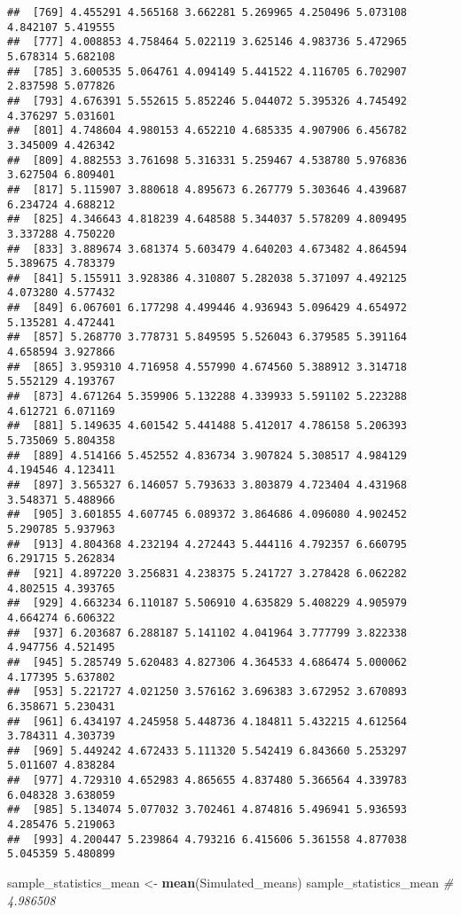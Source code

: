 \documentclass[
]{article}
\newenvironment{Shaded}{\begin{snugshade}}{\end{snugshade}}
\newcommand{\CommentTok}[1]{\textcolor[rgb]{0.56,0.35,0.01}{\textit{#1}}}
\newcommand{\KeywordTok}[1]{\textcolor[rgb]{0.13,0.29,0.53}{\textbf{#1}}}
\newcommand{\NormalTok}[1]{#1}
\newcommand{\StringTok}[1]{\textcolor[rgb]{0.31,0.60,0.02}{#1}}
\begin{document}
\begin{verbatim}
##  [769] 4.455291 4.565168 3.662281 5.269965 4.250496 5.073108 4.842107 5.419555
##  [777] 4.008853 4.758464 5.022119 3.625146 4.983736 5.472965 5.678314 5.682108
##  [785] 3.600535 5.064761 4.094149 5.441522 4.116705 6.702907 2.837598 5.077826
##  [793] 4.676391 5.552615 5.852246 5.044072 5.395326 4.745492 4.376297 5.031601
##  [801] 4.748604 4.980153 4.652210 4.685335 4.907906 6.456782 3.345009 4.426342
##  [809] 4.882553 3.761698 5.316331 5.259467 4.538780 5.976836 3.627504 6.809401
##  [817] 5.115907 3.880618 4.895673 6.267779 5.303646 4.439687 6.234724 4.688212
##  [825] 4.346643 4.818239 4.648588 5.344037 5.578209 4.809495 3.337288 4.750220
##  [833] 3.889674 3.681374 5.603479 4.640203 4.673482 4.864594 5.389675 4.783379
##  [841] 5.155911 3.928386 4.310807 5.282038 5.371097 4.492125 4.073280 4.577432
##  [849] 6.067601 6.177298 4.499446 4.936943 5.096429 4.654972 5.135281 4.472441
##  [857] 5.268770 3.778731 5.849595 5.526043 6.379585 5.391164 4.658594 3.927866
##  [865] 3.959310 4.716958 4.557990 4.674560 5.388912 3.314718 5.552129 4.193767
##  [873] 4.671264 5.359906 5.132288 4.339933 5.591102 5.223288 4.612721 6.071169
##  [881] 5.149635 4.601542 5.441488 5.412017 4.786158 5.206393 5.735069 5.804358
##  [889] 4.514166 5.452552 4.836734 3.907824 5.308517 4.984129 4.194546 4.123411
##  [897] 3.565327 6.146057 5.793633 3.803879 4.723404 4.431968 3.548371 5.488966
##  [905] 3.601855 4.607745 6.089372 3.864686 4.096080 4.902452 5.290785 5.937963
##  [913] 4.804368 4.232194 4.272443 5.444116 4.792357 6.660795 6.291715 5.262834
##  [921] 4.897220 3.256831 4.238375 5.241727 3.278428 6.062282 4.802515 4.393765
##  [929] 4.663234 6.110187 5.506910 4.635829 5.408229 4.905979 4.664274 6.606322
##  [937] 6.203687 6.288187 5.141102 4.041964 3.777799 3.822338 4.947756 4.521495
##  [945] 5.285749 5.620483 4.827306 4.364533 4.686474 5.000062 4.177395 5.637802
##  [953] 5.221727 4.021250 3.576162 3.696383 3.672952 3.670893 6.358671 5.230431
##  [961] 6.434197 4.245958 5.448736 4.184811 5.432215 4.612564 3.784311 4.303739
##  [969] 5.449242 4.672433 5.111320 5.542419 6.843660 5.253297 5.011607 4.838284
##  [977] 4.729310 4.652983 4.865655 4.837480 5.366564 4.339783 6.048328 3.638059
##  [985] 5.134074 5.077032 3.702461 4.874816 5.496941 5.936593 4.285476 5.219063
##  [993] 4.200447 5.239864 4.793216 6.415606 5.361558 4.877038 5.045359 5.480899
\end{verbatim}

\begin{Shaded}
\begin{Highlighting}[]
\NormalTok{sample\_statistics\_mean \textless{}{-}}\StringTok{ }\KeywordTok{mean}\NormalTok{(Simulated\_means)}
\NormalTok{sample\_statistics\_mean }\CommentTok{\#  4.986508}
\end{Highlighting}
\end{Shaded}
\end{document}
